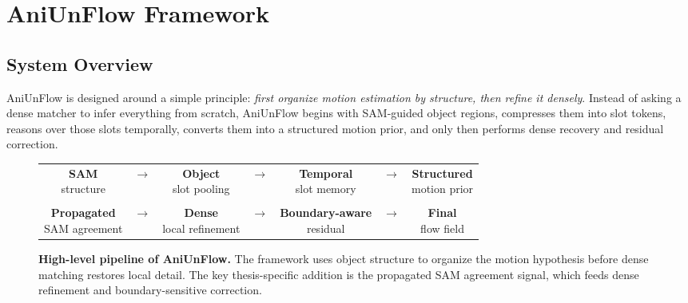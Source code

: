 \section{AniUnFlow Framework}
\label{sec:method}

\subsection{System Overview}

AniUnFlow is designed around a simple principle: \emph{first organize motion estimation by structure, then refine it densely}. Instead of asking a dense matcher to infer everything from scratch, AniUnFlow begins with SAM-guided object regions, compresses them into slot tokens, reasons over those slots temporally, converts them into a structured motion prior, and only then performs dense recovery and residual correction.

\begin{figure}[t]
\centering
\setlength{\tabcolsep}{4pt}
\renewcommand{\arraystretch}{1.2}
\begin{tabular}{ccccccc}
\fbox{\parbox{0.13\textwidth}{\centering \textbf{SAM}\\structure}} &
$\rightarrow$ &
\fbox{\parbox{0.14\textwidth}{\centering \textbf{Object}\\slot pooling}} &
$\rightarrow$ &
\fbox{\parbox{0.14\textwidth}{\centering \textbf{Temporal}\\slot memory}} &
$\rightarrow$ &
\fbox{\parbox{0.14\textwidth}{\centering \textbf{Structured}\\motion prior}} \\
&&&&&&\\
\fbox{\parbox{0.13\textwidth}{\centering \textbf{Propagated}\\SAM agreement}} &
$\rightarrow$ &
\fbox{\parbox{0.14\textwidth}{\centering \textbf{Dense}\\local refinement}} &
$\rightarrow$ &
\fbox{\parbox{0.14\textwidth}{\centering \textbf{Boundary-aware}\\residual}} &
$\rightarrow$ &
\fbox{\parbox{0.14\textwidth}{\centering \textbf{Final}\\flow field}} \\
\end{tabular}
\caption{\textbf{High-level pipeline of AniUnFlow.} The framework uses object structure to organize the motion hypothesis before dense matching restores local detail. The key thesis-specific addition is the propagated SAM agreement signal, which feeds dense refinement and boundary-sensitive correction.}
\label{fig:aniunflow_pipeline}
\end{figure}

